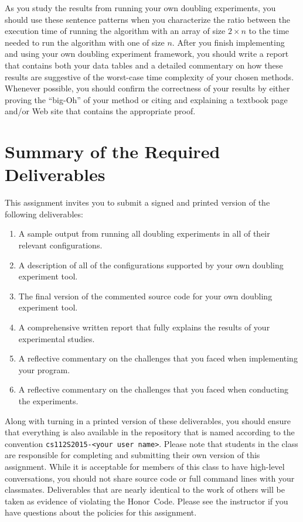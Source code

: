 As you study the results from running your own doubling experiments, you should use these sentence patterns when you
characterize the ratio between the execution time of running the algorithm with an array of size $2 \times n$ to the
time needed to run the algorithm with one of size $n$. After you finish implementing and using your own doubling
experiment framework, you should write a report that contains both your data tables and a detailed commentary on how
these results are suggestive of the worst-case time complexity of your chosen methods.  Whenever possible, you should
confirm the correctness of your results by either proving the ``big-Oh'' of your method or citing and explaining a
textbook page and/or Web site that contains the appropriate proof.

\section*{Summary of the Required Deliverables}

  This assignment invites you to submit a signed and printed version of the following deliverables:

  \begin{enumerate}

  \item A sample output from running all doubling experiments in all of their relevant configurations.

  \item A description of all of the configurations supported by your own doubling experiment tool.

  \item The final version of the commented source code for your own doubling experiment tool.

  \item A comprehensive written report that fully explains the results of your experimental studies.

  \item A reflective commentary on the challenges that you faced when implementing your program.

  \item A reflective commentary on the challenges that you faced when conducting the experiments.

  \end{enumerate}

  Along with turning in a printed version of these deliverables, you should ensure that everything is also available in
  the repository that is named according to the convention {\tt cs112S2015-<your user name>}. Please note that students
  in the class are responsible for completing and submitting their own version of this assignment.    While it is
  acceptable for members of this class to have high-level conversations, you should not share source code or full
  command lines with your classmates.  Deliverables that are nearly identical to the work of others will be taken as
  evidence of violating the \mbox{Honor Code}.  Please see the instructor if you have questions about the policies for
  this assignment.

  

